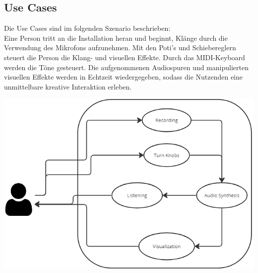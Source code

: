 \documentclass[12pt]{scrartcl}%
\theoremstyle{nonumberplain}
\begin{document}
\subsection{Use Cases}
Die Use Cases sind im folgenden Szenario beschrieben:\\
Eine Person tritt an die Installation heran und beginnt, Klänge durch die Verwendung des Mikrofons aufzunehmen. Mit den Poti's und Schiebereglern steuert die Person die Klang- und visuellen Effekte. Durch das MIDI-Keyboard werden die Töne gesteuert. Die aufgenommenen Audiospuren und manipulierten visuellen Effekte werden in Echtzeit wiedergegeben, sodass die Nutzenden eine unmittelbare kreative Interaktion erleben.
\begin{center}
 \includegraphics[scale=0.4]{usecases2.png}
\end{center}
\newpage
\end{document}
